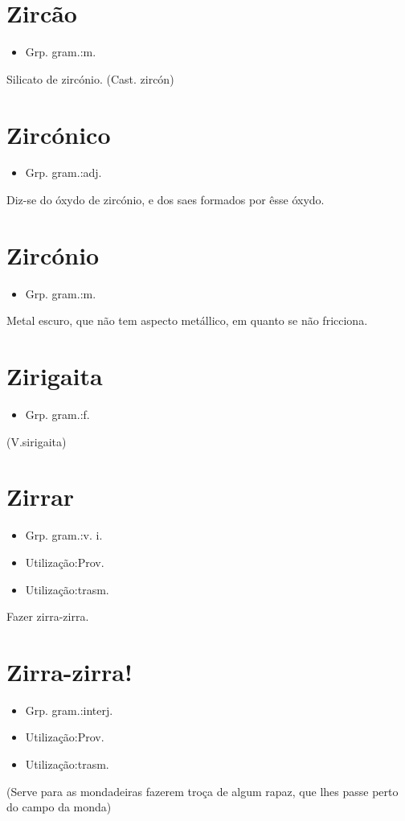 \section{Zircão}
\begin{itemize}
\item {Grp. gram.:m.}
\end{itemize}
Silicato de zircónio.
(Cast. \textunderscore zircón\textunderscore )
\section{Zircónico}
\begin{itemize}
\item {Grp. gram.:adj.}
\end{itemize}
Diz-se do óxydo de zircónio, e dos saes formados por êsse óxydo.
\section{Zircónio}
\begin{itemize}
\item {Grp. gram.:m.}
\end{itemize}
Metal escuro, que não tem aspecto metállico, em quanto se não fricciona.
\section{Zirigaita}
\begin{itemize}
\item {Grp. gram.:f.}
\end{itemize}
(V.sirigaita)
\section{Zirrar}
\begin{itemize}
\item {Grp. gram.:v. i.}
\end{itemize}
\begin{itemize}
\item {Utilização:Prov.}
\end{itemize}
\begin{itemize}
\item {Utilização:trasm.}
\end{itemize}
Fazer zirra-zirra.
\section{Zirra-zirra!}
\begin{itemize}
\item {Grp. gram.:interj.}
\end{itemize}
\begin{itemize}
\item {Utilização:Prov.}
\end{itemize}
\begin{itemize}
\item {Utilização:trasm.}
\end{itemize}
(Serve para as mondadeiras fazerem troça de algum rapaz, que lhes passe perto do campo da monda)
